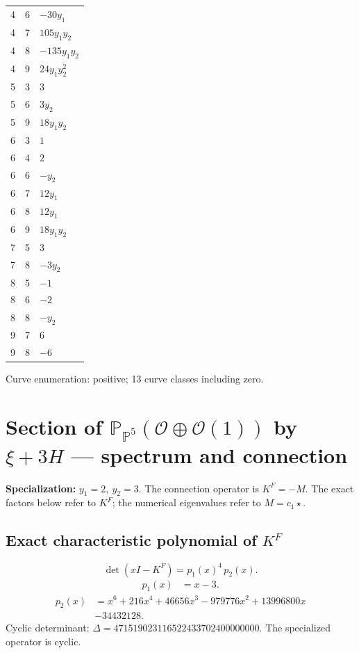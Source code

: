 \documentclass[10pt,a4paper]{article}
\begin{document}
{\begin{longtable}{rrp{125mm}}
4 & 6 & $- 30 y_{1}$\\
4 & 7 & $105 y_{1} y_{2}$\\
4 & 8 & $- 135 y_{1} y_{2}$\\
4 & 9 & $24 y_{1} y_{2}^{2}$\\
5 & 3 & $3$\\
5 & 6 & $3 y_{2}$\\
5 & 9 & $18 y_{1} y_{2}$\\
6 & 3 & $1$\\
6 & 4 & $2$\\
6 & 6 & $- y_{2}$\\
6 & 7 & $12 y_{1}$\\
6 & 8 & $12 y_{1}$\\
6 & 9 & $18 y_{1} y_{2}$\\
7 & 5 & $3$\\
7 & 8 & $- 3 y_{2}$\\
8 & 5 & $-1$\\
8 & 6 & $-2$\\
8 & 8 & $- y_{2}$\\
9 & 7 & $6$\\
9 & 8 & $-6$\\
\end{longtable}}
Curve enumeration: positive; 13 curve classes including zero.
\clearpage\section*{Section of $\mathbb P_{\mathbb P^{5}}(\mathcal O\oplus \mathcal O(1))$ by $\xi +3H$ --- spectrum and connection}
\textbf{Specialization:} $y_1=2,\ y_2=3$. The connection operator is $K^F=-M$. The exact factors below refer to $K^F$; the numerical eigenvalues refer to $M=c_1\star$.
\subsection*{Exact characteristic polynomial of $K^F$}
\[\det(xI-K^F)=p_{1}(x)^{4}\,p_{2}(x).\]
\[\begin{aligned}p_{1}(x)&=x - 3.\end{aligned}\]
\[\begin{aligned}p_{2}(x)&=x^{6} + 216 x^{4} + 46656 x^{3} - 979776 x^{2} + 13996800 x\\&-34432128.\end{aligned}\]
Cyclic determinant: $\Delta=471519023116522433702400000000$. The specialized operator is cyclic.
\end{document}

